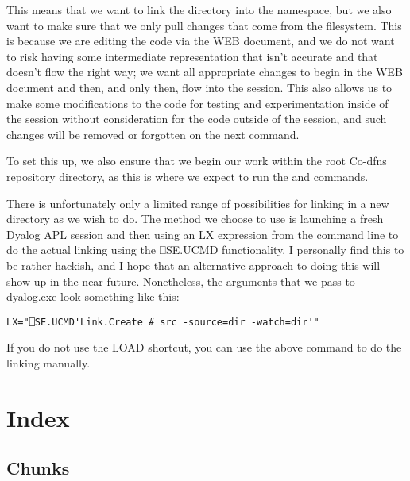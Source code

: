 \documentclass{article}%
\begin{document}
\noindent
This means that we want to link the {\Tt{}\nwendquote} directory into the {\Tt{}{\#}\nwendquote}
namespace,
but we also want to make sure that we only pull changes that come
from the filesystem.
This is because we are editing the code via the WEB document,
and we do not want to risk having some intermediate representation
that isn't accurate and that doesn't flow the right way;
we want all appropriate changes to begin in the WEB document
and then, and only then, flow into the session.
This also allows us to make some modifications to the code for testing
and experimentation inside of the session without consideration
for the code outside of the session,
and such changes will be removed or forgotten on the next {\Tt{}\nwendquote}
command.

To set this up, we also ensure that we begin our work within the
root Co-dfns repository directory, as this is where we expect to run
the {\Tt{}\nwendquote} and {\Tt{}\nwendquote} commands.

There is unfortunately only a limited range of possibilities for
linking in a new directory as we wish to do.
The method we choose to use is launching a fresh Dyalog APL session
and then using an {\Tt{}LX\nwendquote} expression from the command line
to do the actual linking using the {\Tt{}⎕SE.UCMD\nwendquote} functionality.
I personally find this to be rather hackish, and I hope that an
alternative approach to doing this will show up in the near future.
Nonetheless, the arguments that we pass to {\Tt{}dyalog.exe\nwendquote}
look something like this:

\begin{verbatim}
LX="⎕SE.UCMD'Link.Create # src -source=dir -watch=dir'"
\end{verbatim}

If you do not use the {\Tt{}LOAD\nwendquote} shortcut, you can use the above
command to do the linking manually.

\section{Index}

\subsection{Chunks}
\end{document}
